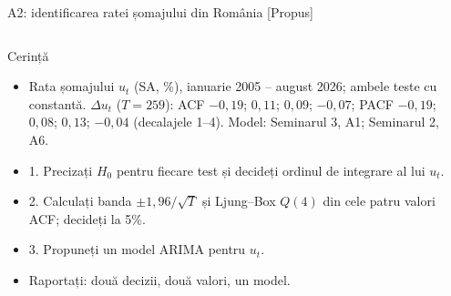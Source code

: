 \begin{frame}{A2: identificarea ratei șomajului din România [Propus]}
\propsub
\itemsize{\scriptsize}
\begin{columns}[T]
\begin{column}{\taskw}
\begin{block}{Cerință}
\begin{center}
\scriptsize
{}
\end{center}
\begin{itemize}
    \item Rata șomajului $u_t$ (SA, \%), ianuarie 2005 -- august 2026; ambele teste cu constantă. $\Delta u_t$ ($T = 259$): ACF $\ensuremath{-}0{,}19$; $0{,}11$; $0{,}09$; $\ensuremath{-}0{,}07$; PACF $\ensuremath{-}0{,}19$; $0{,}08$; $0{,}13$; $\ensuremath{-}0{,}04$ (decalajele 1--4). Model: Seminarul 3, A1; Seminarul 2, A6.
    \item 1. Precizați $H_0$ pentru fiecare test și decideți ordinul de integrare al lui $u_t$.
    \item 2. Calculați banda $\pm 1{,}96/\sqrt{T}$ și Ljung--Box $Q(4)$ din cele patru valori ACF; decideți la 5\%.
    \item 3. Propuneți un model ARIMA pentru $u_t$.
    \item Raportați: două decizii, două valori, un model.
\end{itemize}
\end{block}
\end{column}
\begin{column}{\solw}
\end{column}
\end{columns}
\end{frame}

